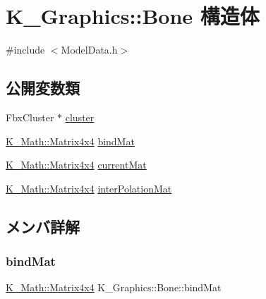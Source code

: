\hypertarget{struct_k___graphics_1_1_bone}{}\section{K\+\_\+\+Graphics\+:\+:Bone 構造体}
\label{struct_k___graphics_1_1_bone}


{\ttfamily \#include $<$Model\+Data.\+h$>$}

\subsection*{公開変数類}
\begin{DoxyCompactItemize}
\item 
Fbx\+Cluster $\ast$ \mbox{\hyperlink{struct_k___graphics_1_1_bone_a600aba5c378824041b5cd7a3ea218544}{cluster}}
\item 
\mbox{\hyperlink{namespace_k___math_a345271af9d32dff2c964bc679b13b45c}{K\+\_\+\+Math\+::\+Matrix4x4}} \mbox{\hyperlink{struct_k___graphics_1_1_bone_a97cb7b7d9513a7fbc059fa57c7963383}{bind\+Mat}}
\item 
\mbox{\hyperlink{namespace_k___math_a345271af9d32dff2c964bc679b13b45c}{K\+\_\+\+Math\+::\+Matrix4x4}} \mbox{\hyperlink{struct_k___graphics_1_1_bone_a82de526d464ccddea11100c9f8705f61}{current\+Mat}}
\item 
\mbox{\hyperlink{namespace_k___math_a345271af9d32dff2c964bc679b13b45c}{K\+\_\+\+Math\+::\+Matrix4x4}} \mbox{\hyperlink{struct_k___graphics_1_1_bone_a817786fd242058e38092a5631470a962}{inter\+Polation\+Mat}}
\end{DoxyCompactItemize}


\subsection{メンバ詳解}
\mbox{\label{struct_k___graphics_1_1_bone_a97cb7b7d9513a7fbc059fa57c7963383}} 
\subsubsection{\texorpdfstring{bind\+Mat}{bindMat}}
{\footnotesize\ttfamily \mbox{\hyperlink{namespace_k___math_a345271af9d32dff2c964bc679b13b45c}{K\+\_\+\+Math\+::\+Matrix4x4}} K\+\_\+\+Graphics\+::\+Bone\+::bind\+Mat}

